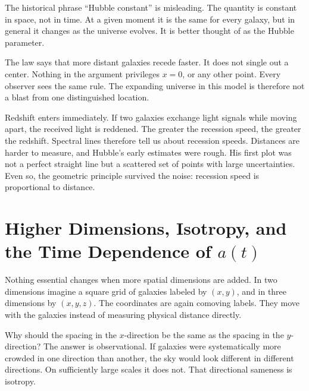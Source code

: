 The historical phrase ``Hubble constant'' is misleading. The quantity is constant in space, not in time. At a given moment it is the same for every galaxy, but in general it changes as the universe evolves. It is better thought of as the Hubble parameter.

The law says that more distant galaxies recede faster. It does not single out a center. Nothing in the argument privileges \(x=0\), or any other point. Every observer sees the same rule. The expanding universe in this model is therefore not a blast from one distinguished location.

Redshift enters immediately. If two galaxies exchange light signals while moving apart, the received light is reddened. The greater the recession speed, the greater the redshift. Spectral lines therefore tell us about recession speeds. Distances are harder to measure, and Hubble's early estimates were rough. His first plot was not a perfect straight line but a scattered set of points with large uncertainties. Even so, the geometric principle survived the noise: recession speed is proportional to distance.

\begin{classroomqa}
\end{classroomqa}

\section{Higher Dimensions, Isotropy, and the Time Dependence of \(a(t)\)}

Nothing essential changes when more spatial dimensions are added. In two dimensions imagine a square grid of galaxies labeled by \((x,y)\), and in three dimensions by \((x,y,z)\). The coordinates are again comoving labels. They move with the galaxies instead of measuring physical distance directly.

Why should the spacing in the \(x\)-direction be the same as the spacing in the \(y\)-direction? The answer is observational. If galaxies were systematically more crowded in one direction than another, the sky would look different in different directions. On sufficiently large scales it does not. That directional sameness is isotropy.

